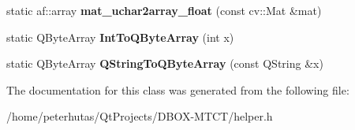 \begin{DoxyCompactItemize}
\mbox{\label{class_helper_a5e3d1077c3e898938b8327ae04d91c71}} 
static af\+::array {\bfseries mat\+\_\+uchar2array\+\_\+float} (const cv\+::\+Mat \&mat)
\item 
\mbox{\label{class_helper_a347169714324c01841485951f7ef34e8}} 
static Q\+Byte\+Array {\bfseries Int\+To\+Q\+Byte\+Array} (int x)
\item 
\mbox{\label{class_helper_a501a21e583f1a529de45b931723204d8}} 
static Q\+Byte\+Array {\bfseries Q\+String\+To\+Q\+Byte\+Array} (const Q\+String \&x)
\end{DoxyCompactItemize}


The documentation for this class was generated from the following file\+:\begin{DoxyCompactItemize}
\item 
/home/peterhutas/\+Qt\+Projects/\+D\+B\+O\+X-\/\+M\+T\+C\+T/helper.\+h\end{DoxyCompactItemize}
